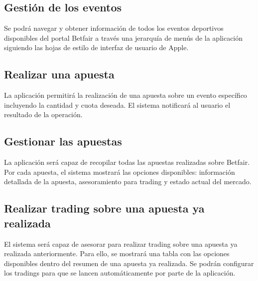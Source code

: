 \subsection{Gestión de los eventos}
Se podrá navegar y obtener información de todos los eventos deportivos disponibles del portal Betfair a través una  %
 jerarquía de menús de la aplicación siguiendo las hojas de estilo de interfaz de usuario de Apple.%
\subsection{Realizar una apuesta}
La aplicación permitirá la realización de una apuesta sobre un evento específico incluyendo la cantidad y cuota deseada. El sistema notificará al usuario el resultado de la operación.
\subsection{Gestionar las apuestas}
La aplicación será capaz de recopilar todas las apuestas realizadas sobre Betfair. Por cada apuesta, el sistema mostrará las opciones disponibles: información detallada de la apuesta, asesoramiento para trading y estado actual del mercado. %
\subsection{Realizar trading sobre una apuesta ya realizada}
El sistema será capaz de asesorar para realizar trading sobre una apuesta ya realizada anteriormente. Para ello, se mostrará una tabla con las opciones disponibles dentro del resumen de una apuesta ya realizada. Se podrán configurar los tradings para que se lancen automáticamente por parte de la aplicación.


